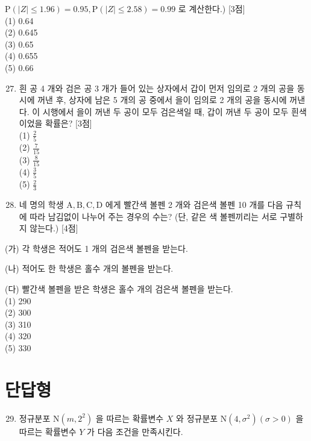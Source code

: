 \documentclass[10pt]{article}
\begin{document}
\(\mathrm{P}(|Z| \leq 1.96)=0.95, \mathrm{P}(|Z| \leq 2.58)=0.99\) 로 계산한다.) [3점]\\
(1) 0.64\\
(2) 0.645\\
(3) 0.65\\
(4) 0.655\\
(5) 0.66

\begin{enumerate}
  \setcounter{enumi}{26}
  \item 흰 공 4 개와 검은 공 3 개가 들어 있는 상자에서 갑이 먼저 임의로 2 개의 공을 동시에 꺼낸 후, 상자에 남은 5 개의 공 중에서 을이 임의로 2 개의 공을 동시에 꺼낸다. 이 시행에서 을이 꺼낸 두 공이 모두 검은색일 때, 갑이 꺼낸 두 공이 모두 흰색이었을 확률은? [3점]\\
(1) \(\frac{2}{5}\)\\
(2) \(\frac{7}{15}\)\\
(3) \(\frac{8}{15}\)\\
(4) \(\frac{3}{5}\)\\
(5) \(\frac{2}{3}\)

  \item 네 명의 학생 \(\mathrm{A}, \mathrm{B}, \mathrm{C}, \mathrm{D}\) 에게 빨간색 볼펜 2 개와 검은색 볼펜 10 개를 다음 규칙에 따라 남김없이 나누어 주는 경우의 수는? (단, 같은 색 볼펜끼리는 서로 구별하지 않는다.) [4점]

\end{enumerate}

(가) 각 학생은 적어도 1 개의 검은색 볼펜을 받는다.

(나) 적어도 한 학생은 홀수 개의 볼펜을 받는다.

(다) 빨간색 볼펜을 받은 학생은 홀수 개의 검은색 볼펜을 받는다.\\
(1) 290\\
(2) 300\\
(3) 310\\
(4) 320\\
(5) 330

\section*{단답형}
\begin{enumerate}
  \setcounter{enumi}{28}
  \item 정규분포 \(\mathrm{N}\left(m, 2^{2}\right)\) 을 따르는 확률변수 \(X\) 와 정규분포 \(\mathrm{N}\left(4, \sigma^{2}\right)(\sigma>0)\) 을 따르는 확률변수 \(Y\) 가 다음 조건을 만족시킨다.
\end{enumerate}
\end{document}
